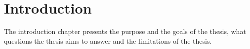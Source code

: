 \chapter{Introduction}\label{cha:intro}

The introduction chapter presents the purpose and the goals of the thesis, what questions the thesis aims to answer and the limitations of the thesis.







